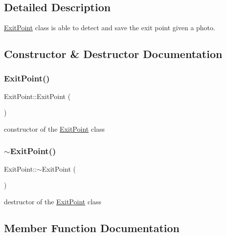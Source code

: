 \subsection{Detailed Description}
\mbox{\hyperlink{class_exit_point}{Exit\+Point}} class is able to detect and save the exit point given a photo. 

\subsection{Constructor \& Destructor Documentation}
\mbox{\label{class_exit_point_ae472f935e952356c9bfe64298474d523}} 
\subsubsection{\texorpdfstring{Exit\+Point()}{ExitPoint()}}
{\footnotesize\ttfamily Exit\+Point\+::\+Exit\+Point (\begin{DoxyParamCaption}{ }\end{DoxyParamCaption})}

constructor of the \mbox{\hyperlink{class_exit_point}{Exit\+Point}} class \mbox{\label{class_exit_point_aa764fee5b37cb7dbda6f2fde39ffbc05}} 
\subsubsection{\texorpdfstring{$\sim$\+Exit\+Point()}{~ExitPoint()}}
{\footnotesize\ttfamily Exit\+Point\+::$\sim$\+Exit\+Point (\begin{DoxyParamCaption}{ }\end{DoxyParamCaption})}

destructor of the \mbox{\hyperlink{class_exit_point}{Exit\+Point}} class 

\subsection{Member Function Documentation}
\mbox{\label{class_exit_point_a2762c0c61bbe71a1a292b86e9517e860}} 
